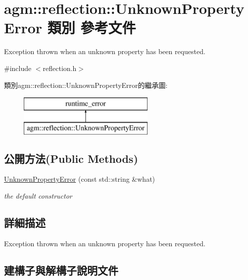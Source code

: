 \hypertarget{classagm_1_1reflection_1_1_unknown_property_error}{}\section{agm\+:\+:reflection\+:\+:Unknown\+Property\+Error 類別 參考文件}
\label{classagm_1_1reflection_1_1_unknown_property_error}


Exception thrown when an unknown property has been requested.  




{\ttfamily \#include $<$reflection.\+h$>$}

類別agm\+:\+:reflection\+:\+:Unknown\+Property\+Error的繼承圖\+:\begin{figure}[H]
\begin{center}
\leavevmode
\includegraphics[height=2.000000cm]{classagm_1_1reflection_1_1_unknown_property_error}
\end{center}
\end{figure}
\subsection*{公開方法(Public Methods)}
\begin{DoxyCompactItemize}
\item 
\hyperlink{classagm_1_1reflection_1_1_unknown_property_error_a2d5a9522830d4a118b56c70c650ccbbe}{Unknown\+Property\+Error} (const std\+::string \&what)
\begin{DoxyCompactList}\small\item\em the default constructor \end{DoxyCompactList}\end{DoxyCompactItemize}


\subsection{詳細描述}
Exception thrown when an unknown property has been requested. 

\subsection{建構子與解構子說明文件}
